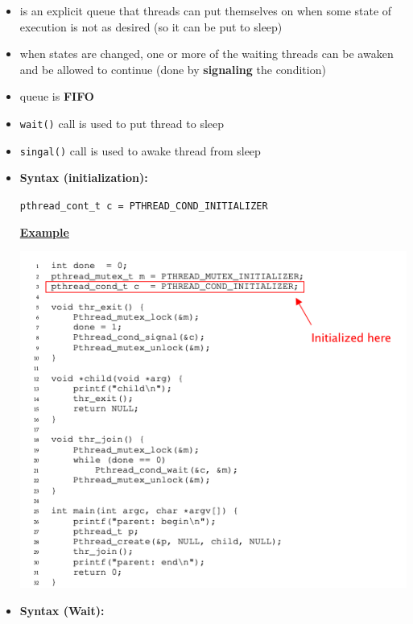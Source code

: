 \documentclass[12pt]{article}
\begin{document}
\begin{itemize}
    \item is an explicit queue that threads can put themselves on when some
    state of execution is not as desired (so it can be put to sleep)
    \item when states are changed, one or more of the waiting threads can be
    awaken and be allowed to continue (done by \textbf{signaling} the condition)
    \item queue is \textbf{FIFO}
    \item \texttt{wait()} call is used to put thread to sleep
    \item \texttt{singal()} call is used to awake thread from sleep
    \item \textbf{Syntax (initialization):}

    \bigskip

    \texttt{pthread\_cont\_t c = PTHREAD\_COND\_INITIALIZER}

    \bigskip

    \underline{\textbf{Example}}

    \begin{center}
    \includegraphics[width=\linewidth]{../images/midterm_2_solution_16.png}
    \end{center}

    \item

    \textbf{Syntax (Wait):}

    \bigskip


\end{itemize}
\end{document}

